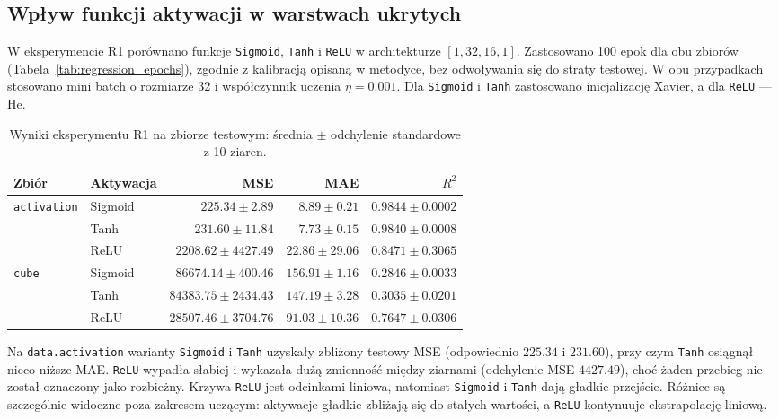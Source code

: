 \documentclass[11pt,a4paper]{article}
\begin{document}
\subsection{Wpływ funkcji aktywacji w warstwach ukrytych}
W eksperymencie R1 porównano funkcje \texttt{Sigmoid}, \texttt{Tanh} i \texttt{ReLU} w architekturze $[1,32,16,1]$. Zastosowano 100 epok dla obu zbiorów (Tabela~\ref{tab:regression_epochs}), zgodnie z kalibracją opisaną w metodyce, bez odwoływania się do straty testowej. W obu przypadkach stosowano mini batch o rozmiarze 32 i współczynnik uczenia $\eta=0.001$. Dla \texttt{Sigmoid} i \texttt{Tanh} zastosowano inicjalizację Xavier, a dla \texttt{ReLU} — He.

\begin{table}[H]
    \centering
    \small
    \caption{Wyniki eksperymentu R1 na zbiorze testowym: średnia $\pm$ odchylenie standardowe z 10 ziaren.}
    \label{tab:r1_regression}
    \begin{tabular}{llrrr}
        \toprule
        \textbf{Zbiór} & \textbf{Aktywacja} & \textbf{MSE} & \textbf{MAE} & \textbf{$R^2$} \\
        \midrule
        \texttt{activation} & Sigmoid & $225.34 \pm 2.89$ & $8.89 \pm 0.21$ & $0.9844 \pm 0.0002$ \\
                             & Tanh    & $231.60 \pm 11.84$ & $7.73 \pm 0.15$ & $0.9840 \pm 0.0008$ \\
                             & ReLU    & $2208.62 \pm 4427.49$ & $22.86 \pm 29.06$ & $0.8471 \pm 0.3065$ \\
        \midrule
        \texttt{cube}       & Sigmoid & $86674.14 \pm 400.46$ & $156.91 \pm 1.16$ & $0.2846 \pm 0.0033$ \\
                             & Tanh    & $84383.75 \pm 2434.43$ & $147.19 \pm 3.28$ & $0.3035 \pm 0.0201$ \\
                             & ReLU    & $28507.46 \pm 3704.76$ & $91.03 \pm 10.36$ & $0.7647 \pm 0.0306$ \\
        \bottomrule
    \end{tabular}
\end{table}

Na \texttt{data.activation} warianty \texttt{Sigmoid} i \texttt{Tanh} uzyskały zbliżony testowy MSE (odpowiednio $225.34$ i $231.60$), przy czym \texttt{Tanh} osiągnął nieco niższe MAE. \texttt{ReLU} wypadła słabiej i wykazała dużą zmienność między ziarnami (odchylenie MSE $4427.49$), choć żaden przebieg nie został oznaczony jako rozbieżny. Krzywa \texttt{ReLU} jest odcinkami liniowa, natomiast \texttt{Sigmoid} i \texttt{Tanh} dają gładkie przejście. Różnice są szczególnie widoczne poza zakresem uczącym: aktywacje gładkie zbliżają się do stałych wartości, a \texttt{ReLU} kontynuuje ekstrapolację liniową.
\end{document}
